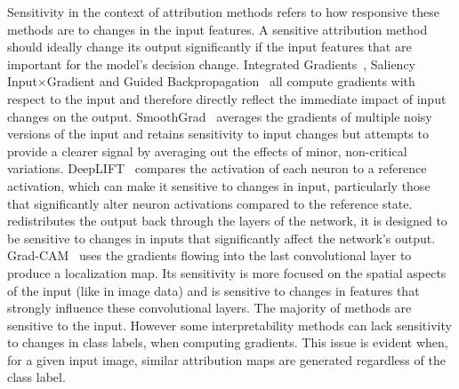 Sensitivity in the context of attribution methods refers to how responsive these methods are to changes in the input features. A sensitive attribution method should ideally change its output significantly if the input features that are important for the model's decision change. Integrated Gradients~\cite{SundararajanTY17}, Saliency~\cite{SimonyanVZ13} Input$\times$Gradient\cite{SimonyanVZ13} and Guided Backpropagation~\cite{SpringenbergDBR14} all compute gradients with respect to the input and therefore directly reflect the immediate impact of input changes on the output. SmoothGrad~\cite{SmilkovTKVW17} averages the gradients of multiple noisy versions of the input and retains sensitivity to input changes but attempts to provide a clearer signal by averaging out the effects of minor, non-critical variations. DeepLIFT~\cite{ShrikumarGK17} compares the activation of each neuron to a reference activation, which can make it sensitive to changes in input, particularly those that significantly alter neuron activations compared to the reference state. \LRP~\cite{bach2015pixel} redistributes the output back through the layers of the network, it is designed to be sensitive to changes in inputs that significantly affect the network’s output. Grad-CAM~\cite{SelvarajuCDVPB20} uses the gradients flowing into the last convolutional layer to produce a localization map. Its sensitivity is more focused on the spatial aspects of the input (like in image data) and is sensitive to changes in features that strongly influence these convolutional layers. The majority of methods are sensitive to the input. However some interpretability methods can lack sensitivity to changes in class labels, when computing gradients. This issue is evident when, for a given input image, similar attribution maps are generated regardless of the class label.







